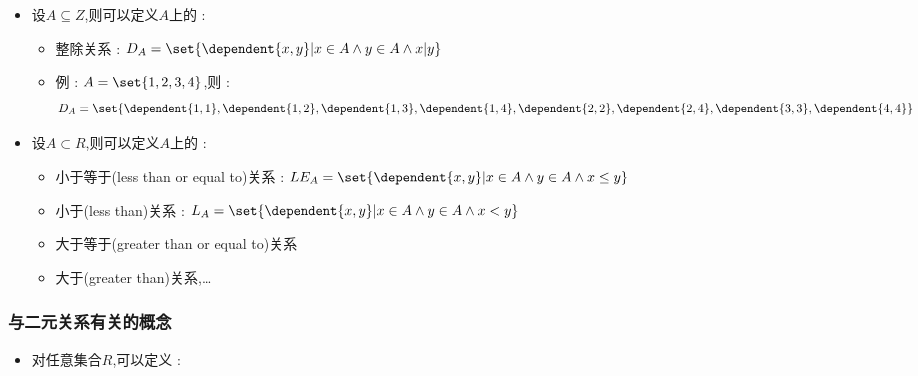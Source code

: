 {{{{\begin{itemize}
{            \begin{itemize}
              \item 空关系 : $\emptyset$
              \item 恒等关系 : $I_A = \set{\dependent{x,x}| x \in A}$
              \item 全域关系 : $E_A = A \times A = \set{\dependent{x,y} | x \in A \land y \in A}$
              \item 包含关系 : $\subseteq_A = \set{\dependent{x,y}|x \subseteq \land y \subseteq A \land x \subseteq y}$
              \item 真包含关系 : $\subset_A = \set{\dependent{x,y} | x \subseteq A \land y \subseteq A \land x \subset y}$
            \end{itemize}
            }
      \item {
            设$A \subseteq Z$,则可以定义$A$上的 :

            \begin{itemize}
              \item 整除关系 : $D_A = \set{\dependent{x,y} | x \in A \land y \in A \land x|y}$
              \item {
                    例 : $A = \set{1,2,3,4}$,则 : $$
                      D_A = \set{\dependent{1,1},\dependent{1,2},\dependent{1,3},\dependent{1,4},\dependent{2,2},\dependent{2,4},\dependent{3,3},\dependent{4,4}}
                    $$
                    }
            \end{itemize}
            }
      \item {
            设$A \subset R$,则可以定义$A$上的 :

            \begin{itemize}
              \item 小于等于(less than or equal to)关系 : $LE_A = \set{\dependent{x,y}|x \in A \land y \in A \land x \leq y}$
              \item 小于(less than)关系 : $L_A = \set{\dependent{x,y}| x \in A \land y \in A \land x < y}$
              \item 大于等于(greater than or equal to)关系
              \item 大于(greater than)关系,\dots
            \end{itemize}
            }
    \end{itemize}
  }%

  \subsubsection{与二元关系有关的概念}{
    \begin{itemize}
      \item {
            对任意集合$R$,可以定义 :

}
\end{itemize}}}}}
